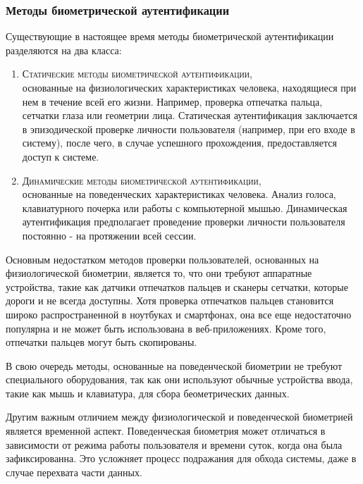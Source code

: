\documentclass[12pt]{article}
\begin{document}
    \subsubsection{Методы биометрической аутентификации}
    \label{sec:Intro:ApplicationArea:AuthenticationMethods:Biometric}

    \par Существующие в настоящее время методы биометрической аутентификации разделяются на два класса:
    \begin{enumerate}
        \item \textsc{Статические методы биометрической аутентификации}, \\
        основанные на физиологических характеристиках человека, находящиеся при нем в течение всей его жизни. Например, проверка отпечатка пальца, сетчатки глаза или геометрии лица. Статическая аутентификация заключается в эпизодической проверке личности пользователя (например, при его входе в систему), после чего, в случае успешного прохождения, предоставляется доступ к системе.

        \item \textsc{Динамические методы биометрической аутентификации}, \\
        основанные на поведенческих характеристиках человека. Анализ голоса, клавиатурного почерка или работы с компьютерной мышью. Динамическая аутентификация предполагает проведение проверки личности пользователя постоянно - на протяжении всей сессии.
    \end{enumerate}

    \par Основным недостатком методов проверки пользователей, основанных на физиологической биометрии, является то, что они требуют аппаратные устройства, такие как датчики отпечатков пальцев и сканеры сетчатки, которые дороги и не всегда доступны. Хотя проверка отпечатков пальцев становится широко распространенной в ноутбуках и смартфонах, она все еще недостаточно популярна и не может быть использована в веб-приложениях. Кроме того, отпечатки пальцев могут быть скопированы.

    \par В свою очередь методы, основанные на поведенческой биометрии не требуют специального оборудования, так как они используют обычные устройства ввода, такие как мышь и клавиатура, для сбора беометрических данных.

    \par Другим важным отличием между физиологической и поведенческой биометрией является временной аспект. Поведенческая биометрия может отличаться в зависимости от режима работы пользователя и времени суток, когда она была зафиксированна. Это усложняет процесс подражания для обхода системы, даже в случае перехвата части данных.
\end{document}
